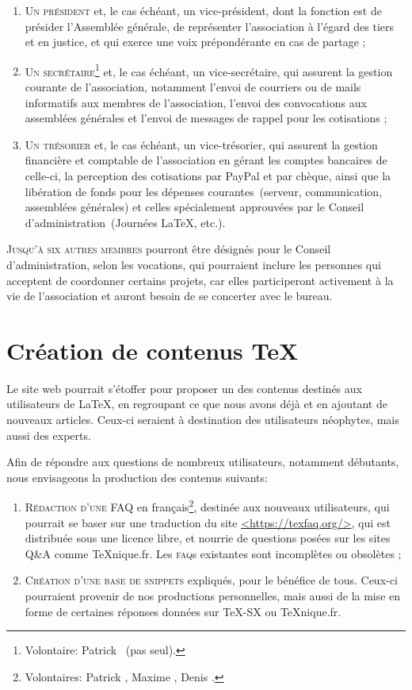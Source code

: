 \documentclass{tufte-handout}
\newcommand{\ratio}[3][]{\marginpar{\footnotesize{\textcolor{teal}{Temps requis: #2 / Utilité: #3}\par\noindent \textcolor{teal}{#1}}}}
\begin{document}
\begin{enumerate}
	\item\textsc{Un président} et, le cas échéant, un vice-président, dont la fonction est de présider l'Assemblée générale, de représenter l'association à l'égard des tiers et en justice, et qui exerce une voix prépondérante en cas de partage ;
	\item\textsc{Un secrétaire}\footnote{Volontaire: Patrick ~(pas seul).} et, le cas échéant, un vice-secrétaire, qui assurent la gestion courante de l'association, notamment l'envoi de courriers ou de mails informatifs aux membres de l'association, l'envoi des convocations aux assemblées générales et l'envoi de messages de rappel pour les cotisations ;
	\item\textsc{Un trésorier} et, le cas échéant, un vice-trésorier, qui assurent la gestion financière et comptable de l'association en gérant les comptes bancaires de celle-ci, la perception des cotisations par PayPal et par chèque, ainsi que la libération de fonds pour les dépenses courantes~(serveur, communication, assemblées générales) et celles spécialement approuvées par le Conseil d'administration~(Journées \LaTeX, etc.).
\end{enumerate}

\textsc{Jusqu'à six autres membres} pourront être désignés pour le Conseil d'administration, selon les vocations, qui pourraient inclure les personnes qui acceptent de coordonner certains projets, car elles participeront activement à la vie de l'association et auront besoin de se concerter avec le bureau.

\section{Création de contenus \TeX}

Le site web pourrait s'étoffer pour proposer un des contenus destinés aux utilisateurs de \LaTeX, en regroupant ce que nous avons déjà et en ajoutant de nouveaux articles. Ceux-ci seraient à destination des utilisateurs néophytes, mais aussi des experts.

Afin de répondre aux questions de nombreux utilisateurs, notamment débutants, nous envisageons la production des contenus suivants:

\begin{enumerate}
	\item\textsc{Rédaction d'une FAQ}\ratio[Effort collectif possible]{+++}{+++} en français\footnote{Volontaires: Patrick , Maxime , Denis .}, destinée aux nouveaux utilisateurs, qui pourrait se baser sur une traduction du site \url{<https://texfaq.org/>}, qui est distribuée sous une licence libre, et nourrie de questions posées sur les sites Q\&A comme \TeX nique.fr. Les \textsc{faq}s existantes sont incomplètes ou obsolètes ;
	\item\textsc{Création d'une base de snippets}\ratio[Petites contributions régulières, sur le long terme]{++}{+++}  expliqués, pour le bénéfice de tous. Ceux-ci pourraient provenir de nos productions personnelles, mais aussi de la mise en forme de certaines réponses données sur TeX-SX ou \TeX nique.fr.
\end{enumerate}
\end{document}
